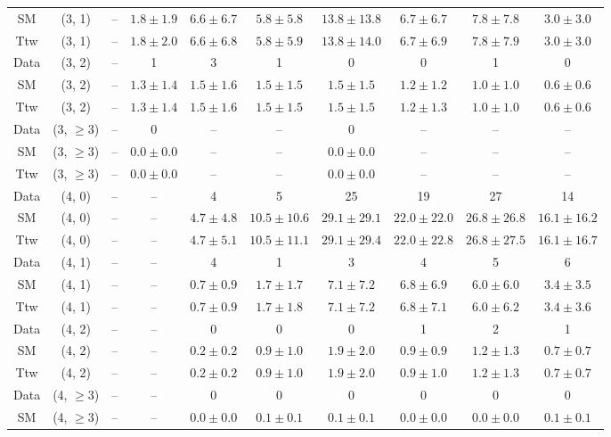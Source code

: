 \begin{table}[h!]
{\begin{tabular}{cccccccccc}
	SM & (3, 1) & -- & $1.8\pm 1.9$ & $6.6\pm 6.7$ & $5.8\pm 5.8$ & $13.8\pm 13.8$ & $6.7\pm 6.7$ & $7.8\pm 7.8$ & $3.0\pm 3.0$ \\[0.5ex] 
	Ttw & (3, 1) & -- & $1.8\pm 2.0$ & $6.6\pm 6.8$ & $5.8\pm 5.9$ & $13.8\pm 14.0$ & $6.7\pm 6.9$ & $7.8\pm 7.9$ & $3.0\pm 3.0$ \\[0.5ex] 
	Data & (3, 2) & -- & 1 & 3 & 1 & 0 & 0 & 1 & 0 \\[0.5ex] 
	SM & (3, 2) & -- & $1.3\pm 1.4$ & $1.5\pm 1.6$ & $1.5\pm 1.5$ & $1.5\pm 1.5$ & $1.2\pm 1.2$ & $1.0\pm 1.0$ & $0.6\pm 0.6$ \\[0.5ex] 
	Ttw & (3, 2) & -- & $1.3\pm 1.4$ & $1.5\pm 1.6$ & $1.5\pm 1.5$ & $1.5\pm 1.5$ & $1.2\pm 1.3$ & $1.0\pm 1.0$ & $0.6\pm 0.6$ \\[0.5ex] 
	Data & (3, $\ge3$) & -- & 0 & -- & -- & 0 & -- & -- & -- \\[0.5ex] 
	SM & (3, $\ge3$) & -- & $0.0\pm 0.0$ & -- & -- & $0.0\pm 0.0$ & -- & -- & -- \\[0.5ex] 
	Ttw & (3, $\ge3$) & -- & $0.0\pm 0.0$ & -- & -- & $0.0\pm 0.0$ & -- & -- & -- \\[0.5ex] 
	Data & (4, 0) & -- & -- & 4 & 5 & 25 & 19 & 27 & 14 \\[0.5ex] 
	SM & (4, 0) & -- & -- & $4.7\pm 4.8$ & $10.5\pm 10.6$ & $29.1\pm 29.1$ & $22.0\pm 22.0$ & $26.8\pm 26.8$ & $16.1\pm 16.2$ \\[0.5ex] 
	Ttw & (4, 0) & -- & -- & $4.7\pm 5.1$ & $10.5\pm 11.1$ & $29.1\pm 29.4$ & $22.0\pm 22.8$ & $26.8\pm 27.5$ & $16.1\pm 16.7$ \\[0.5ex] 
	Data & (4, 1) & -- & -- & 4 & 1 & 3 & 4 & 5 & 6 \\[0.5ex] 
	SM & (4, 1) & -- & -- & $0.7\pm 0.9$ & $1.7\pm 1.7$ & $7.1\pm 7.2$ & $6.8\pm 6.9$ & $6.0\pm 6.0$ & $3.4\pm 3.5$ \\[0.5ex] 
	Ttw & (4, 1) & -- & -- & $0.7\pm 0.9$ & $1.7\pm 1.8$ & $7.1\pm 7.2$ & $6.8\pm 7.1$ & $6.0\pm 6.2$ & $3.4\pm 3.6$ \\[0.5ex] 
	Data & (4, 2) & -- & -- & 0 & 0 & 0 & 1 & 2 & 1 \\[0.5ex] 
	SM & (4, 2) & -- & -- & $0.2\pm 0.2$ & $0.9\pm 1.0$ & $1.9\pm 2.0$ & $0.9\pm 0.9$ & $1.2\pm 1.3$ & $0.7\pm 0.7$ \\[0.5ex] 
	Ttw & (4, 2) & -- & -- & $0.2\pm 0.2$ & $0.9\pm 1.0$ & $1.9\pm 2.0$ & $0.9\pm 1.0$ & $1.2\pm 1.3$ & $0.7\pm 0.7$ \\[0.5ex] 
	Data & (4, $\ge3$) & -- & -- & 0 & 0 & 0 & 0 & 0 & 0 \\[0.5ex] 
	SM & (4, $\ge3$) & -- & -- & $0.0\pm 0.0$ & $0.1\pm 0.1$ & $0.1\pm 0.1$ & $0.0\pm 0.0$ & $0.0\pm 0.0$ & $0.1\pm 0.1$ \\[0.5ex] 

\end{tabular}}
\end{table}
